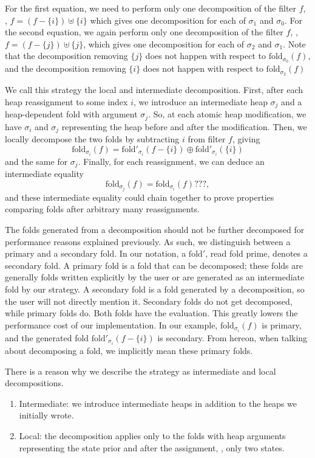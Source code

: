 \documentclass[msc,oneside]{ubcthesis}
\theoremstyle{definition}
\begin{document}
For the first equation, we need to perform only one decomposition of the filter $f$, \ie, $f = (f - \{i\}) \uplus \{i\}$ which gives one decomposition for each of $\sigma_1$ and $\sigma_0$. For the second equation, we again perform only one decomposition of the filter $f$, \ie, $f = (f - \{j\}) \uplus \{j\}$, which gives one decomposition for each of $\sigma_2$ and $\sigma_1$. Note that the decomposition removing $\{j\}$ does not happen with respect to $\textrm{fold}_{\sigma_0}(f)$, and the decomposition removing $\{i\}$ does not happen with respect to $\textrm{fold}_{\sigma_2}(f)$

We call this strategy the local and intermediate decomposition. First, after each heap reassignment to some index $i$, we introduce an intermediate heap $\sigma_j$ and a heap-dependent fold with argument $\sigma_j$. So, at each atomic heap modification, we have $\sigma_i$ and $\sigma_j$ representing the heap before and after the modification. Then, we locally decompose the two folds by subtracting $i$ from filter $f$, giving $$\textrm{fold}_{\sigma_i}(f) = \textrm{fold}'_{\sigma_i}(f - \{i\}) \oplus \textrm{fold}'_{\sigma_i}(\{i\})$$ and the same for $\sigma_j$.
Finally, for each reassignment, we can deduce an intermediate equality 
$$ \textrm{fold}_{\sigma_j}(f) = \textrm{fold}_{\sigma_i}(f) ???,$$ and these intermediate equality could chain together to prove properties comparing folds after arbitrary many reassignments. 

The folds generated from a decomposition should not be further decomposed for performance reasons explained previously. As such, we distinguish between a primary and a secondary fold. In our notation, a $\textrm{fold}'$, read fold prime, denotes a secondary fold. A primary fold is a fold that can be decomposed; these folds are generally folds written explicitly by the user or are generated as an intermediate fold by our strategy. A secondary fold is a fold generated by a decomposition, so the user will not directly mention it. Secondary folds do not get decomposed, while primary folds do. Both folds have the evaluation. This greatly lowers the performance cost of our implementation. In our example, $\textrm{fold}_{\sigma_i}(f)$ is primary, and the generated fold $\textrm{fold}'_{\sigma_i}(f - \{i\})$ is secondary. From hereon, when talking about decomposing a fold, we implicitly mean these primary folds.

There is a reason why we describe the strategy as intermediate and local decompositions.
\begin{enumerate}
    \item Intermediate: we introduce intermediate heaps in addition to the heaps we initially wrote.
    \item Local: the decomposition applies only to the folds with heap arguments representing the state prior and after the assignment, \ie, only two states. 
\end{enumerate}
\end{document}
